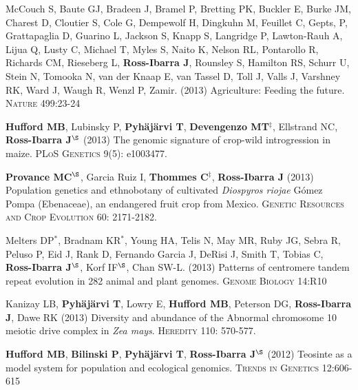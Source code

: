 \documentclass[letterpaper,10pt]{article}
\begin{document}
\begin{etaremune}
\item McCouch S, Baute GJ, Bradeen J, Bramel P, Bretting PK, Buckler E, Burke JM, Charest D, Cloutier S, Cole G, Dempewolf H, Dingkuhn M, Feuillet C, Gepts, P, Grattapaglia D, Guarino L, Jackson S, Knapp S, Langridge P, Lawton-Rauh A, Lijua Q, Lusty C, Michael T, Myles S, Naito K, Nelson RL, Pontarollo R, Richards CM, Rieseberg L, {\bf Ross-Ibarra J}, Rounsley S, Hamilton RS, Schurr U, Stein N, Tomooka N, van der Knaap E, van Tassel D, Toll J, Valls J, Varshney RK, Ward J, Waugh R, Wenzl P, Zamir. (2013) Agriculture: Feeding the future. \textsc{Nature} 499:23-24

\item {\bf Hufford MB}, Lubinsky P, {\bf Pyh\"aj\"arvi T}, {\bf Devengenzo MT}$^\ddagger$, Ellstrand NC, {\bf Ross-Ibarra J}$^\S$ (2013) The genomic signature of crop-wild introgression in maize. \textsc{PLoS Genetics} 9(5): e1003477. %


\item {\bf Provance MC}$^\S$, Garcia Ruiz I, {\bf Thommes C}$^\ddagger$, {\bf Ross-Ibarra J} (2013) Population genetics and ethnobotany of cultivated \emph{Diospyros riojae} G\'omez Pompa (Ebenaceae), an endangered fruit crop from Mexico. \textsc{Genetic Resources and Crop Evolution} 60: 2171-2182.


\item Melters DP$^*$, Bradnam KR$^*$, Young HA, Telis N, May MR, Ruby JG, Sebra R, Peluso P, Eid J, Rank D, Fernando Garcia J, DeRisi J, Smith T, Tobias C, {\bf Ross-Ibarra J}$^\S$, Korf IF$^\S$, Chan SW-L. (2013) Patterns of centromere tandem repeat evolution in 282 animal and plant genomes. \textsc{Genome Biology} 14:R10


\item Kanizay LB, {\bf Pyh\"aj\"arvi T}, Lowry E, {\bf Hufford MB}, Peterson DG, {\bf Ross-Ibarra J}, Dawe RK (2013) Diversity and abundance of the Abnormal chromosome 10 meiotic drive complex in \emph{Zea mays}. \textsc{Heredity} 110: 570-577.


\item {\bf Hufford MB}, {\bf Bilinski P}, {\bf Pyh\"aj\"arvi T}, {\bf Ross-Ibarra J}$^\S$ (2012) Teosinte as a model system for population and ecological genomics. \textsc{Trends in Genetics} 12:606-615 %



\end{etaremune}
\end{document}
